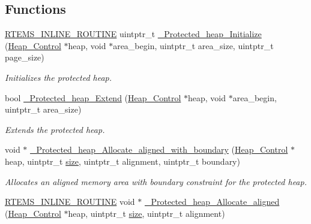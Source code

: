 \subsection*{Functions}
\begin{DoxyCompactItemize}
\item 
\mbox{\hyperlink{group__RTEMSScoreBaseDefs_gac216239df231d5dbd15e3520b0b9313f}{R\+T\+E\+M\+S\+\_\+\+I\+N\+L\+I\+N\+E\+\_\+\+R\+O\+U\+T\+I\+NE}} uintptr\+\_\+t \mbox{\hyperlink{group__RTEMSScoreProtHeap_ga0f09fcdd50fcb5de78cdb10c0cb3b7e5}{\+\_\+\+Protected\+\_\+heap\+\_\+\+Initialize}} (\mbox{\hyperlink{structHeap__Control}{Heap\+\_\+\+Control}} $\ast$heap, void $\ast$area\+\_\+begin, uintptr\+\_\+t area\+\_\+size, uintptr\+\_\+t page\+\_\+size)
\begin{DoxyCompactList}\small\item\em Initializes the protected heap. \end{DoxyCompactList}\item 
bool \mbox{\hyperlink{group__RTEMSScoreProtHeap_gaeafd4fefda9100f0b9484f97f19d1093}{\+\_\+\+Protected\+\_\+heap\+\_\+\+Extend}} (\mbox{\hyperlink{structHeap__Control}{Heap\+\_\+\+Control}} $\ast$heap, void $\ast$area\+\_\+begin, uintptr\+\_\+t area\+\_\+size)
\begin{DoxyCompactList}\small\item\em Extends the protected heap. \end{DoxyCompactList}\item 
void $\ast$ \mbox{\hyperlink{group__RTEMSScoreProtHeap_ga76e8188c79871f71f9af86616c6ebc53}{\+\_\+\+Protected\+\_\+heap\+\_\+\+Allocate\+\_\+aligned\+\_\+with\+\_\+boundary}} (\mbox{\hyperlink{structHeap__Control}{Heap\+\_\+\+Control}} $\ast$heap, uintptr\+\_\+t \mbox{\hyperlink{sun4u_2tte_8h_a245260f6f74972558f61b85227df5aae}{size}}, uintptr\+\_\+t alignment, uintptr\+\_\+t boundary)
\begin{DoxyCompactList}\small\item\em Allocates an aligned memory area with boundary constraint for the protected heap. \end{DoxyCompactList}\item 
\mbox{\hyperlink{group__RTEMSScoreBaseDefs_gac216239df231d5dbd15e3520b0b9313f}{R\+T\+E\+M\+S\+\_\+\+I\+N\+L\+I\+N\+E\+\_\+\+R\+O\+U\+T\+I\+NE}} void $\ast$ \mbox{\hyperlink{group__RTEMSScoreProtHeap_gaf60206138a64a845eea1a2e6519b9ae2}{\+\_\+\+Protected\+\_\+heap\+\_\+\+Allocate\+\_\+aligned}} (\mbox{\hyperlink{structHeap__Control}{Heap\+\_\+\+Control}} $\ast$heap, uintptr\+\_\+t \mbox{\hyperlink{sun4u_2tte_8h_a245260f6f74972558f61b85227df5aae}{size}}, uintptr\+\_\+t alignment)

\end{DoxyCompactItemize}
